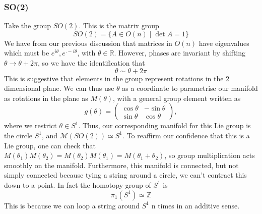 \subsubsection{SO(2)} 
Take the group $SO(2)$. This is the matrix group 
\[ 
	SO(2) = \{A \in O ( n )  \mid \det A = 1 \}  
\] We have from our previous discussion that matrices in $O (n ) $ have eigenvalues which must be $e^{ i \theta}, e^{. -i \theta} $, with $\theta \in \mathbb{R}$. However, phases are invariant by shifting $\theta \rightarrow \theta + 2 \pi$, so we have the identification that 
\[ 
	\theta \sim \theta + 2 \pi 
\] This is suggestive that elements in the group represent rotations in the 2 dimensional plane. We can thus use $\theta$ as a coordinate to parametrise our manifold as rotations in the plane as $M(\theta)$, with a general group element written as 
\[ 
	g(\theta)  = \begin{pmatrix}
	\cos \theta &   - \sin \theta \\
	\sin \theta & \cos \theta
	\end{pmatrix}, 
\]
where we restrict $\theta \in S^1$. Thus, our corresponding manifold for this Lie group is the circle $S^1$, and $\mathcal{M} (SO(2)) \simeq S^1$. 
To reaffirm our confidence that this is a Lie group, one can check that $M ( \theta_1 ) M(\theta_2 )  = M(\theta_2)M(\theta_1) = M(\theta_1 + \theta_2) $, so group multiplication acts smoothly on the manifold. Furthermore, this manifold is connected, but not simply connected because tying a string around a circle, we can't contract this down to a point. In fact the homotopy group of $S^1$ is 
\[ 
	\pi_1 (S^1 ) \simeq \mathbb{Z}
\] This is because we can loop a string around $S^1 $ n times in an additive sense. 



